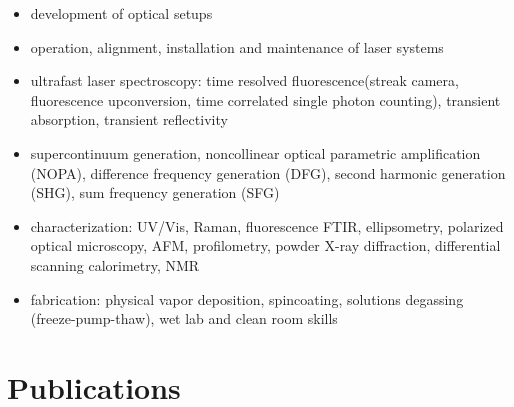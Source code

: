 \documentclass[11pt,letterpaper,sans]{moderncv} %
\begin{document}
\begin{itemize}
	\item development of optical setups
	\item operation, alignment, installation and maintenance of laser systems
	\item ultrafast laser spectroscopy: time resolved fluorescence(streak camera, 
	      fluorescence 	upconversion, time correlated single photon counting),
	      transient absorption, transient reflectivity
	\item supercontinuum generation, noncollinear optical parametric amplification (NOPA),
	      difference frequency generation (DFG), second harmonic generation (SHG),
	      sum frequency generation (SFG)
	\item characterization: UV/Vis, Raman, fluorescence FTIR, ellipsometry,
	      polarized optical microscopy, AFM, profilometry, powder X-ray diffraction, 
	      differential scanning calorimetry, NMR
	\item fabrication: physical vapor deposition, spincoating,
	      solutions degassing (freeze-pump-thaw), wet lab and clean room skills
\end{itemize}






\section {Publications}
\end{document}
